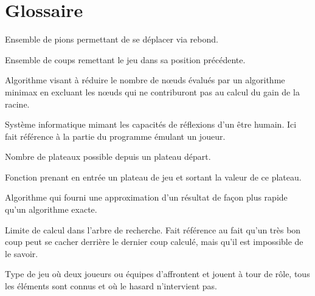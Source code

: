 \chapter{Glossaire}

	\begin{description}[style=nextline]

		\item[Chemin] Ensemble de pions permettant de se déplacer via rebond.

		\item[Cycle] Ensemble de coups remettant le jeu dans sa position précédente.

		\item[\'Elagage Alpha-Beta] Algorithme visant à réduire le nombre de n\oe{}uds
		évalués par un algorithme minimax en excluant les n\oe{}uds qui ne contriburont
		pas au calcul du gain de la racine.

		\item[Intelligence artificielle] Système informatique mimant les capacités de réflexions
		d'un être humain. Ici fait référence à la partie du programme émulant un joueur.

		\item[Facteur de branchement] Nombre de plateaux possible depuis un plateau départ.

		\item[Fonction d'évaluation] Fonction prenant en entrée un plateau de jeu et sortant la valeur de
		ce plateau.

		\item[Heuristique] Algorithme qui fourni une approximation d'un résultat de façon plus rapide
		qu'un algorithme exacte.

		\item[Horizon] Limite de calcul dans l'arbre de recherche. Fait référence au fait qu'un très bon coup peut
		se cacher derrière le dernier coup calculé, mais qu'il est impossible de le savoir.

		\item[Jeu combinatoire abstrait] Type de jeu où deux joueurs ou équipes d'affrontent et jouent à tour de rôle,
		tous les éléments sont connus et où le hasard n'intervient pas.


\end{description}
